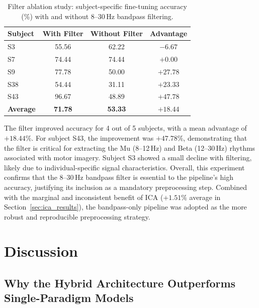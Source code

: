 \documentclass[12pt, a4paper]{article}
\begin{document}
\begin{table}[h]
\centering
\caption{Filter ablation study: subject-specific fine-tuning accuracy (\%) with and without 8--30\,Hz bandpass filtering.}
\label{tab:filter_ablation}
\begin{tabular}{lccc}
\toprule
Subject & With Filter & Without Filter & Advantage \\
\midrule
S3  & 55.56 & 62.22 & $-6.67$ \\
S7  & 74.44 & 74.44 & $+0.00$ \\
S9  & 77.78 & 50.00 & $+27.78$ \\
S38 & 54.44 & 31.11 & $+23.33$ \\
S43 & 96.67 & 48.89 & $+47.78$ \\
\midrule
\textbf{Average} & \textbf{71.78} & \textbf{53.33} & $\mathbf{+18.44}$ \\
\bottomrule
\end{tabular}
\end{table}

The filter improved accuracy for 4 out of 5 subjects, with a mean advantage of $+18.44\%$. For subject S43, the improvement was $+47.78\%$, demonstrating that the filter is critical for extracting the Mu (8--12\,Hz) and Beta (12--30\,Hz) rhythms associated with motor imagery. Subject S3 showed a small decline with filtering, likely due to individual-specific signal characteristics. Overall, this experiment confirms that the 8--30\,Hz bandpass filter is essential to the pipeline's high accuracy, justifying its inclusion as a mandatory preprocessing step. Combined with the marginal and inconsistent benefit of ICA ($+1.51\%$ average in Section~\ref{sec:ica_results}), the bandpass-only pipeline was adopted as the more robust and reproducible preprocessing strategy.

\section{Discussion}

\subsection{Why the Hybrid Architecture Outperforms Single-Paradigm Models}
\end{document}

